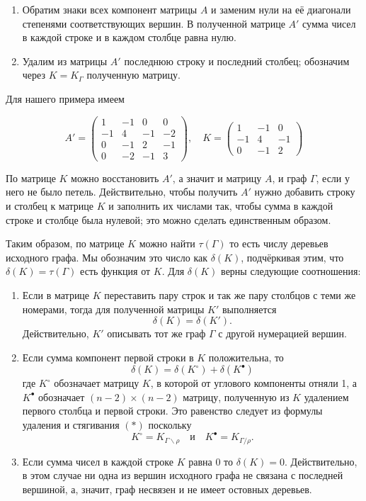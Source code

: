 \documentclass{article}
\begin{document}
\begin{enumerate}
\item Обратим знаки всех компонент матрицы $A$ и заменим нули на её диагонали степенями соответствующих вершин. 
В полученной матрице $A'$ сумма чисел в каждой строке и в каждом столбце равна нулю. 
\item Удалим из матрицы $A'$ последнюю строку и последний столбец;
обозначим через $K=K_\Gamma$ полученную матрицу.
\end{enumerate}

Для нашего примера имеем

\[A'=\left(
\begin{matrix}
1&-1&0&0
\\
-1&4&-1&-2
\\
0&-1&2&-1
\\
0&-2&-1&3
\end{matrix}
\right),
\quad 
K=\left(
\begin{matrix}
1&-1&0
\\
-1&4&-1
\\
0&-1&2
\end{matrix}
\right)\]

По матрице $K$ можно восстановить $A'$, а значит и матрицу $A$, и граф $\Gamma$, если у него не было петель.
Действительно, чтобы получить $A'$ нужно добавить строку и столбец к матрице $K$ и заполнить их числами так, чтобы сумма в каждой строке и столбце была нулевой;
это можно сделать единственным образом.

Таким образом, по матрице $K$ можно найти $\tau(\Gamma)$ то есть числу деревьев исходного графа.
Мы обозначим это число как $\delta(K)$, подчёркивая этим, что $\delta(K)=\tau(\Gamma)$ есть функция от $K$.
Для $\delta(K)$ верны следующие соотношения:
\begin{enumerate}
\item Если в матрице $K$ переставить пару строк и так же пару столбцов с теми же номерами,
тогда для полученной матрицы $K'$ выполняется 
\[\delta(K)=\delta(K').\]
Действительно, $K'$ описывать тот же граф $\Gamma$ с другой нумерацией вершин.
\item 
Если сумма компонент первой строки в $K$ положительна, то
\[\delta(K)=\delta(K^{\circ})+\delta(K^{\bullet})\]
где $K^{\circ}$ обозначает матрицу $K$, в которой от углового компоненты отняли 1, а $K^{\bullet}$ обозначает $(n-2)\times(n-2)$ матрицу, полученную из $K$ удалением первого столбца и первой строки.
Это равенство следует из формулы удаления и стягивания $({*})$ поскольку \[K^{\circ}=K_{\Gamma\backslash\rho}\quad\text{и}\quad K^{\bullet}=K_{\Gamma/\rho}.\]
\item Если сумма чисел в каждой строке $K$ равна $0$ то $\delta(K)=0$. 
Действительно, в этом случае ни одна из вершин исходного графа не связана с последней вершиной, а, значит, граф несвязен и не имеет остовных деревьев.
\end{enumerate}
\end{document}
